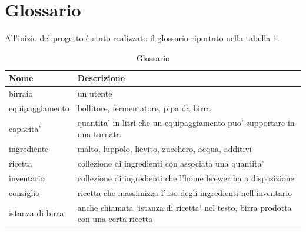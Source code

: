 \documentclass[a4paper,12pt]{report}
\begin{document}
    	\section{Glossario}
	All'inizio del progetto è stato realizzato il glossario riportato nella tabella \ref{tab:Gloassario}.
    		\begin{table}[!h]
      			\renewcommand{\arraystretch}{1.2}
      			\begin{tabular}{p{}|p{}} 
        				\textbf{Nome}  & \textbf{Descrizione} \\
    				\hline
           			birraio & un utente \\
                        		equipaggiamento & bollitore, fermentatore, pipa da birra \\
                            	capacita' & quantita' in litri che un equipaggiamento puo' supportare in una turnata \\
                          	ingrediente & malto, luppolo, lievito, zucchero, acqua, additivi \\
                          	ricetta & collezione di ingredienti con associata una quantita' \\
                          	inventario & collezione di ingredienti che l'home brewer ha a disposizione \\
                            	consiglio & ricetta che massimizza l'uso degli ingredienti nell'inventario \\
                            	istanza di birra & anche chiamata `istanza di ricetta` nel testo, birra prodotta con una certa ricetta \\
        			\end{tabular}
        			\caption{Glossario}
      			\label{tab:Gloassario}
    		\end{table}
\newpage
\end{document}
